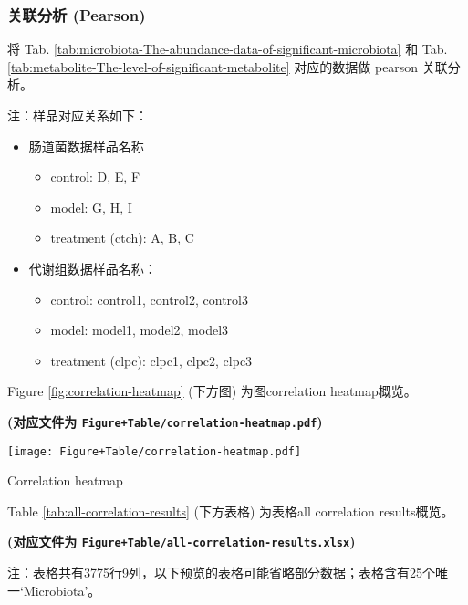 \documentclass[
]{article}
\providecommand{\tightlist}{%
  \setlength{\itemsep}{0pt}\setlength{\parskip}{0pt}}
\begin{document}
\hypertarget{ux5173ux8054ux5206ux6790-pearson}{%
\subsubsection{关联分析 (Pearson)}\label{ux5173ux8054ux5206ux6790-pearson}}

将 Tab. \ref{tab:microbiota-The-abundance-data-of-significant-microbiota} 和 Tab. \ref{tab:metabolite-The-level-of-significant-metabolite} 对应的数据做 pearson 关联分析。

注：样品对应关系如下：

\begin{itemize}
\tightlist
\item
  肠道菌数据样品名称

  \begin{itemize}
  \tightlist
  \item
    control: D, E, F
  \item
    model: G, H, I
  \item
    treatment (ctch): A, B, C
  \end{itemize}
\item
  代谢组数据样品名称：

  \begin{itemize}
  \tightlist
  \item
    control: control1, control2, control3
  \item
    model: model1, model2, model3
  \item
    treatment (clpc): clpc1, clpc2, clpc3
  \end{itemize}
\end{itemize}

Figure \ref{fig:correlation-heatmap} (下方图) 为图correlation heatmap概览。

\textbf{(对应文件为 \texttt{Figure+Table/correlation-heatmap.pdf})}

\def\@captype{figure}
\begin{center}
\texttt{[image: Figure+Table/correlation-heatmap.pdf]}
\caption{Correlation heatmap}\label{fig:correlation-heatmap}
\end{center}

Table \ref{tab:all-correlation-results} (下方表格) 为表格all correlation results概览。

\textbf{(对应文件为 \texttt{Figure+Table/all-correlation-results.xlsx})}

\begin{center}\begin{tcolorbox}[colback=gray!10, colframe=gray!50, width=0.9\linewidth, arc=1mm, boxrule=0.5pt]注：表格共有3775行9列，以下预览的表格可能省略部分数据；表格含有25个唯一`Microbiota'。
\end{tcolorbox}
\end{center}
\end{document}
